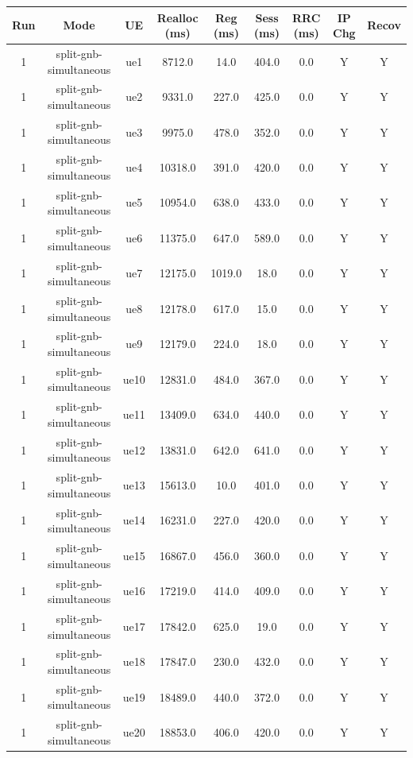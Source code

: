 \begin{table}[ht]
\centering
\begin{tabular}{|c|c|c|c|c|c|c|c|c|}
\hline
Run & Mode & UE & Realloc (ms) & Reg (ms) & Sess (ms) & RRC (ms) & IP Chg & Recov \\
\hline
1 & split-gnb-simultaneous & ue1 & 8712.0 & 14.0 & 404.0 & 0.0 & Y & Y \\
1 & split-gnb-simultaneous & ue2 & 9331.0 & 227.0 & 425.0 & 0.0 & Y & Y \\
1 & split-gnb-simultaneous & ue3 & 9975.0 & 478.0 & 352.0 & 0.0 & Y & Y \\
1 & split-gnb-simultaneous & ue4 & 10318.0 & 391.0 & 420.0 & 0.0 & Y & Y \\
1 & split-gnb-simultaneous & ue5 & 10954.0 & 638.0 & 433.0 & 0.0 & Y & Y \\
1 & split-gnb-simultaneous & ue6 & 11375.0 & 647.0 & 589.0 & 0.0 & Y & Y \\
1 & split-gnb-simultaneous & ue7 & 12175.0 & 1019.0 & 18.0 & 0.0 & Y & Y \\
1 & split-gnb-simultaneous & ue8 & 12178.0 & 617.0 & 15.0 & 0.0 & Y & Y \\
1 & split-gnb-simultaneous & ue9 & 12179.0 & 224.0 & 18.0 & 0.0 & Y & Y \\
1 & split-gnb-simultaneous & ue10 & 12831.0 & 484.0 & 367.0 & 0.0 & Y & Y \\
1 & split-gnb-simultaneous & ue11 & 13409.0 & 634.0 & 440.0 & 0.0 & Y & Y \\
1 & split-gnb-simultaneous & ue12 & 13831.0 & 642.0 & 641.0 & 0.0 & Y & Y \\
1 & split-gnb-simultaneous & ue13 & 15613.0 & 10.0 & 401.0 & 0.0 & Y & Y \\
1 & split-gnb-simultaneous & ue14 & 16231.0 & 227.0 & 420.0 & 0.0 & Y & Y \\
1 & split-gnb-simultaneous & ue15 & 16867.0 & 456.0 & 360.0 & 0.0 & Y & Y \\
1 & split-gnb-simultaneous & ue16 & 17219.0 & 414.0 & 409.0 & 0.0 & Y & Y \\
1 & split-gnb-simultaneous & ue17 & 17842.0 & 625.0 & 19.0 & 0.0 & Y & Y \\
1 & split-gnb-simultaneous & ue18 & 17847.0 & 230.0 & 432.0 & 0.0 & Y & Y \\
1 & split-gnb-simultaneous & ue19 & 18489.0 & 440.0 & 372.0 & 0.0 & Y & Y \\
1 & split-gnb-simultaneous & ue20 & 18853.0 & 406.0 & 420.0 & 0.0 & Y & Y \\

\end{tabular}
\end{table}
